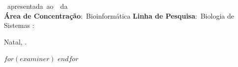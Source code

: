 \documentclass[
	12pt,				%
	oneside,			%
	a4paper,			%
	chapter=TITLE,		%
	section=TITLE,		%
	english,			%
	brazil				%
	]{abntex2}
\begin{document}
\begin{folhadeaprovacao}
	\OnehalfSpacing
	\begin{center}
	\imprimirautor\\%
	\vspace*{10pt}
	\textbf{\imprimirtitulo}%
	\ifnotempty{\imprimirsubtitulo}{:~\imprimirsubtitulo}\\%
	\vspace*{\baselineskip}
	\end{center}
	\imprimirtipotrabalho~apresentada~ao~\imprimirprograma~da~\imprimirinstituicao\\
	\bigskip\newline
	\textbf{Área de Concentração}:~Bioinformática\newline%
	\textbf{Linha de Pesquisa}:~Biologia de Sistemas\newline%
	\imprimirorientadorRotulo:~\imprimirorientador\newline%
	\begin{flushright}
	Natal, \imprimirdata.
	\end{flushright}
	\vspace*{\baselineskip}

	\vspace*{2\baselineskip}
  $for(examiner)$
  $endfor$
	\vspace*{\fill}
	\centering
\end{folhadeaprovacao}
\end{document}
